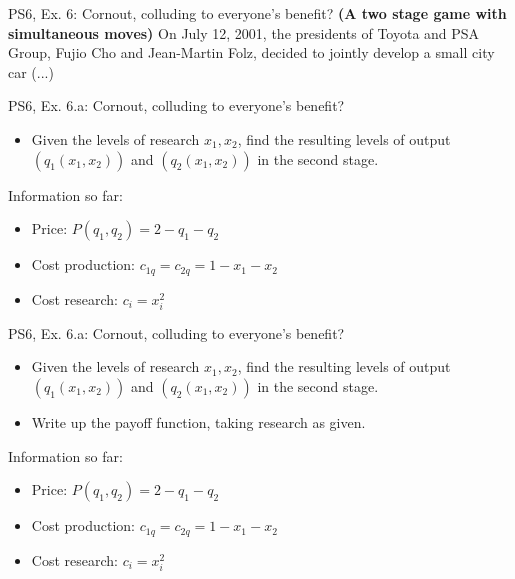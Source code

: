 \begin{frame}{PS6, Ex. 6: Cornout, colluding to everyone's benefit?}
  \textbf{(A two stage game with simultaneous moves)} On July 12, 2001, the presidents of Toyota and PSA Group, Fujio Cho and Jean-Martin Folz, decided to jointly develop a small city car (...)
\end{frame}

\begin{frame}{PS6, Ex. 6.a: Cornout, colluding to everyone's benefit?}
    \begin{itemize}
    \item[(a)] Given the levels of research $x_1,x_2$, find the resulting levels of output $(q_1(x_1, x_2))$ and $(q_2(x_1, x_2))$ in the second stage.
    \end{itemize}
    \vfill\null
  \begin{multicols}{2}
    \vfill\null \columnbreak
    Information so far:
    \begin{itemize}
      \item[1] Price: $P(q_1,q_2)=2-q_1-q_2$
      \item[2] Cost production: $c_{1q} = c_{2q} = 1 - x_1 - x_2$
      \item[3] Cost research: $c_i=x_i^2$
    \end{itemize}
    \vfill\null
  \end{multicols}
\end{frame}
\begin{frame}{PS6, Ex. 6.a: Cornout, colluding to everyone's benefit?}
    \begin{itemize}
    \item[(a)] Given the levels of research $x_1,x_2$, find the resulting levels of output $(q_1(x_1, x_2))$ and $(q_2(x_1, x_2))$ in the second stage.
    \end{itemize}
    \vfill\null
  \begin{multicols}{2}
    \begin{itemize}
      \item[(Step 1)] Write up the payoff function, taking research as given.
    \end{itemize}
    \vfill\null \columnbreak
    Information so far:
    \begin{itemize}
      \item[1] Price: $P(q_1,q_2)=2-q_1-q_2$
      \item[2] Cost production: $c_{1q} = c_{2q} = 1 - x_1 - x_2$
      \item[3] Cost research: $c_i=x_i^2$
    \end{itemize}
    \vfill\null
  \end{multicols}
\end{frame}
